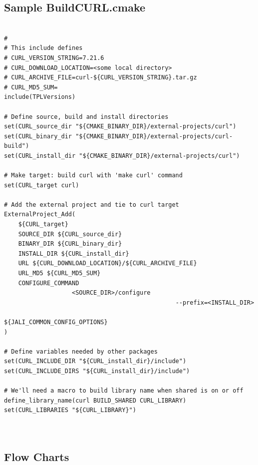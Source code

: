 \documentclass[12pt]{article}
\begin{document}
\subsection{Sample BuildCURL.cmake}
\begin{verbatim}

#
# This include defines
# CURL_VERSION_STRING=7.21.6
# CURL_DOWNLOAD_LOCATION=<some local directory>
# CURL_ARCHIVE_FILE=curl-${CURL_VERSION_STRING}.tar.gz
# CURL_MD5_SUM=
include(TPLVersions)

# Define source, build and install directories
set(CURL_source_dir "${CMAKE_BINARY_DIR}/external-projects/curl")
set(CURL_binary_dir "${CMAKE_BINARY_DIR}/external-projects/curl-build")
set(CURL_install_dir "${CMAKE_BINARY_DIR}/external-projects/curl")

# Make target: build curl with 'make curl' command
set(CURL_target curl)

# Add the external project and tie to curl target
ExternalProject_Add(
    ${CURL_target}
    SOURCE_DIR ${CURL_source_dir}
    BINARY_DIR ${CURL_binary_dir}
    INSTALL_DIR ${CURL_install_dir}
    URL ${CURL_DOWNLOAD_LOCATION}/${CURL_ARCHIVE_FILE}
    URL_MD5 ${CURL_MD5_SUM}
    CONFIGURE_COMMAND
                   <SOURCE_DIR>/configure
                                                --prefix=<INSTALL_DIR>
                                                 ${JALI_COMMON_CONFIG_OPTIONS}
)
                                      
# Define variables needed by other packages
set(CURL_INCLUDE_DIR "${CURL_install_dir}/include")
set(CURL_INCLUDE_DIRS "${CURL_install_dir}/include")

# We'll need a macro to build library name when shared is on or off
define_library_name(curl BUILD_SHARED CURL_LIBRARY)
set(CURL_LIBRARIES "${CURL_LIBRARY}")

                                       
\end{verbatim}

\subsection{Flow Charts}
\end{document}
